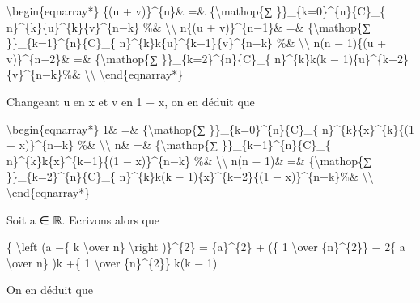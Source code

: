 \documentclass[]{article}
\begin{document}
\textbackslash{}begin\{eqnarray*\} \{(u + v)\}\^{}\{n\}\& =\&
\{\textbackslash{}mathop\{∑ \}\}\_\{k=0\}\^{}\{n\}\{C\}\_\{
n\}\^{}\{k\}\{u\}\^{}\{k\}\{v\}\^{}\{n−k\} \%\&
\textbackslash{}\textbackslash{} n\{(u + v)\}\^{}\{n−1\}\& =\&
\{\textbackslash{}mathop\{∑ \}\}\_\{k=1\}\^{}\{n\}\{C\}\_\{
n\}\^{}\{k\}k\{u\}\^{}\{k−1\}\{v\}\^{}\{n−k\} \%\&
\textbackslash{}\textbackslash{} n(n − 1)\{(u + v)\}\^{}\{n−2\}\& =\&
\{\textbackslash{}mathop\{∑ \}\}\_\{k=2\}\^{}\{n\}\{C\}\_\{
n\}\^{}\{k\}k(k − 1)\{u\}\^{}\{k−2\}\{v\}\^{}\{n−k\}\%\&
\textbackslash{}\textbackslash{} \textbackslash{}end\{eqnarray*\}

Changeant u en x et v en 1 − x, on en déduit que

\textbackslash{}begin\{eqnarray*\} 1\& =\& \{\textbackslash{}mathop\{∑
\}\}\_\{k=0\}\^{}\{n\}\{C\}\_\{ n\}\^{}\{k\}\{x\}\^{}\{k\}\{(1 −
x)\}\^{}\{n−k\} \%\& \textbackslash{}\textbackslash{} n\& =\&
\{\textbackslash{}mathop\{∑ \}\}\_\{k=1\}\^{}\{n\}\{C\}\_\{
n\}\^{}\{k\}k\{x\}\^{}\{k−1\}\{(1 − x)\}\^{}\{n−k\} \%\&
\textbackslash{}\textbackslash{} n(n − 1)\& =\&
\{\textbackslash{}mathop\{∑ \}\}\_\{k=2\}\^{}\{n\}\{C\}\_\{
n\}\^{}\{k\}k(k − 1)\{x\}\^{}\{k−2\}\{(1 − x)\}\^{}\{n−k\}\%\&
\textbackslash{}\textbackslash{} \textbackslash{}end\{eqnarray*\}

Soit a ∈ ℝ. Ecrivons alors que

\{ \textbackslash{}left (a −\{ k \textbackslash{}over n\}
\textbackslash{}right )\}\^{}\{2\} = \{a\}\^{}\{2\} + (\{ 1
\textbackslash{}over \{n\}\^{}\{2\}\} − 2\{ a \textbackslash{}over n\}
)k +\{ 1 \textbackslash{}over \{n\}\^{}\{2\}\} k(k − 1)

On en déduit que
\end{document}
